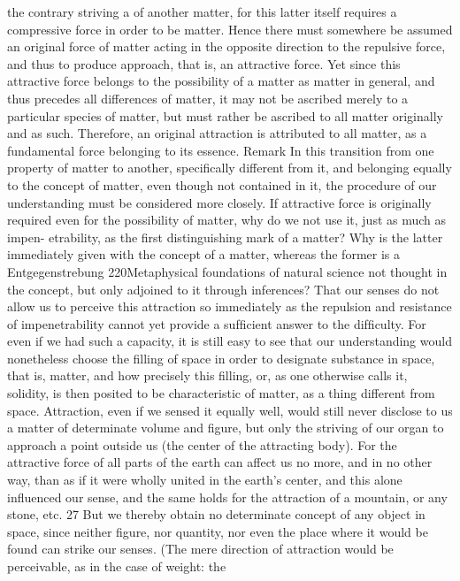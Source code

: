 the contrary striving a of another matter, for this latter itself requires a
compressive force in order to be matter. Hence there must somewhere
be assumed an original force of matter acting in the opposite direction to
the repulsive force, and thus to produce approach, that is, an attractive
force. Yet since this attractive force belongs to the possibility of a matter
as matter in general, and thus precedes all differences of matter, it may
not be ascribed merely to a particular species of matter, but must rather
be ascribed to all matter originally and as such. Therefore, an original
attraction is attributed to all matter, as a fundamental force belonging to
its essence.
Remark
In this transition from one property of matter to another, speciﬁcally
different from it, and belonging equally to the concept of matter, even
though not contained in it, the procedure of our understanding must be
considered more closely. If attractive force is originally required even
for the possibility of matter, why do we not use it, just as much as impen-
etrability, as the ﬁrst distinguishing mark of a matter? Why is the latter
immediately given with the concept of a matter, whereas the former is
a
Entgegenstrebung
220Metaphysical foundations of natural science
not thought in the concept, but only adjoined to it through inferences?
That our senses do not allow us to perceive this attraction so immediately
as the repulsion and resistance of impenetrability cannot yet provide a
sufﬁcient answer to the difﬁculty. For even if we had such a capacity, it
is still easy to see that our understanding would nonetheless choose the
ﬁlling of space in order to designate substance in space, that is, matter,
and how precisely this ﬁlling, or, as one otherwise calls it, solidity, is then
posited to be characteristic of matter, as a thing different from space.
Attraction, even if we sensed it equally well, would still never disclose to
us a matter of determinate volume and ﬁgure, but only the striving of our
organ to approach a point outside us (the center of the attracting body).
For the attractive force of all parts of the earth can affect us no more, and
in no other way, than as if it were wholly united in the earth’s center, and
this alone inﬂuenced our sense, and the same holds for the attraction of
a mountain, or any stone, etc. 27 But we thereby obtain no determinate
concept of any object in space, since neither ﬁgure, nor quantity, nor
even the place where it would be found can strike our senses. (The mere
direction of attraction would be perceivable, as in the case of weight: the
